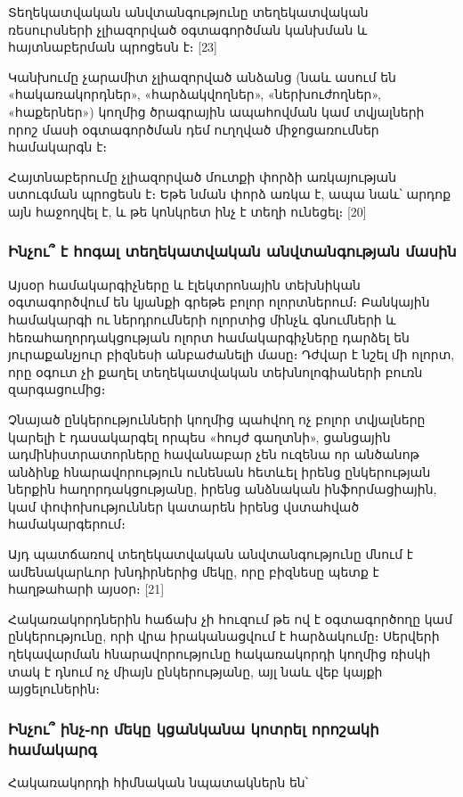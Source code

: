 \documentclass[10pt]{article}
\begin{document}
\begin{sloppypar}
Տեղեկատվական անվտանգությունը տեղեկատվական ռեսուրսների չլիազորված օգտագործման
կանխման և հայտնաբերման պրոցեսն է։ [23]

Կանխումը չարամիտ չլիազորված անձանց (նաև ասում են «հակառակորդներ»,
«հարձակվողներ», «ներխուժողներ», «հաքերներ») կողմից ծրագրային ապահովման կամ
տվյալների որոշ մասի օգտագործման դեմ ուղղված միջոցառումներ համակարգն է։

Հայտնաբերումը չլիազորված մուտքի փորձի առկայության ստուգման պրոցեսն է։ Եթե
նման փորձ առկա է, ապա նաև՝ արդոք այն հաջողվել է, և թե կոնկրետ ինչ է տեղի
ունեցել։ [20]

\subsubsection{Ինչու՞ է հոգալ տեղեկատվական անվտանգության մասին}

Այսօր համակարգիչները և էլեկտրոնային տեխնիկան օգտագործվում են
կյանքի գրեթե բոլոր ոլորտներում։ Բանկային համակարգի ու ներդրումների ոլորտից
մինչև գնումների և հեռահաղորդակցության ոլորտ համակարգիչները դարձել են
յուրաքանչյուր բիզնեսի անբաժանելի մասը։ Դժվար է նշել մի ոլորտ, որը
օգուտ չի քաղել տեղեկատվական տեխնոլոգիաների բուռն զարգացումից։

Չնայած ընկերությունների կողմից պահվող ոչ բոլոր տվյալները կարելի է
դասակարգել որպես «հույժ գաղտնի», ցանցային ադմինիստրատորները հավանաբար
չեն ուզենա որ անծանոթ անձինք հնարավորություն ունենան հետևել
իրենց ընկերության ներքին հաղորդակցությանը,
իրենց անձնական ինֆորմացիային, կամ փոփոխություններ կատարեն իրենց վստահված
համակարգերում։

Այդ պատճառով տեղեկատվական անվտանգությունը մնում է ամենակարևոր խնդիրներից մեկը, որը
բիզնեսը պետք է հաղթահարի այսօր։ [21]

Հակառակորդներին հաճախ չի հուզում թե ով է օգտագործողը կամ ընկերությունը,
որի վրա իրականացվում է հարձակումը։
Սերվերի ղեկավարման հնարավորությունը հակառակորդի կողմից ռիսկի տակ է
դնում ոչ միայն ընկերությանը, այլ նաև վեբ կայքի այցելուներին։


\subsubsection{Ինչու՞ ինչ֊որ մեկը կցանկանա կոտրել որոշակի համակարգ}


Հակառակորդի հիմնական նպատակներն են՝


\end{sloppypar}
\end{document}
